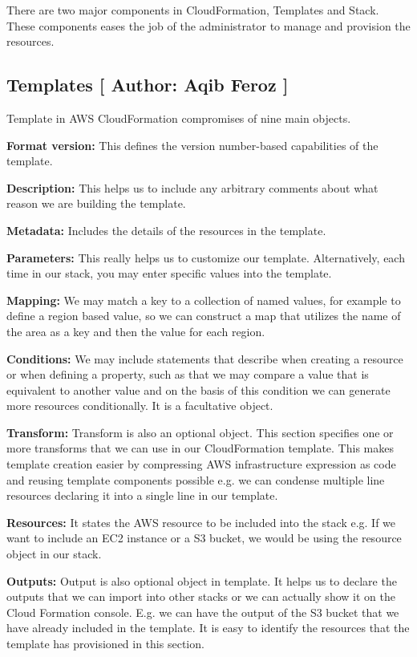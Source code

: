 There are two major components in CloudFormation, Templates and Stack. These components eases the job of the administrator to manage and provision the resources. 
\subsection{Templates [ Author: Aqib Feroz ]}
Template in AWS CloudFormation compromises of nine main objects.

\textbf{Format version:} This defines the version number-based capabilities of the template.

\textbf{Description:} This helps us to include any arbitrary comments about what reason we are building the template.

\textbf{Metadata:} Includes the details of the resources in the template.

\textbf{Parameters:} This really helps us to customize our template. Alternatively, each time in our stack, you may enter specific values into the template.

\textbf{Mapping:} We may match a key to a collection of named values, for example to define a region based value, so we can construct a map that utilizes the name of the area as a key and then the value for each region.

\textbf{Conditions:} We may include statements that describe when creating a resource or when defining a property, such as that we may compare a value that is equivalent to another value and on the basis of this condition we can generate more resources conditionally. It is a facultative object.

\textbf{Transform:} Transform is also an optional object. This section specifies one or more transforms that we can use in our CloudFormation template. This makes template creation easier by compressing AWS infrastructure expression as code and reusing template components possible
e.g. we can condense multiple line resources declaring it into a single line in our template.


\textbf{Resources:} It states the AWS resource to be included into the stack e.g. If we want to include an EC2 instance or a S3 bucket, we would be using the resource object in our stack.

\textbf{Outputs:} Output is also optional object in template. It helps us to declare the outputs that we can import into other stacks or we can actually show it on the Cloud Formation console. E.g. we can have the output of the S3 bucket that we have already included in the template. It is easy to identify the resources that the template has provisioned in this section.

